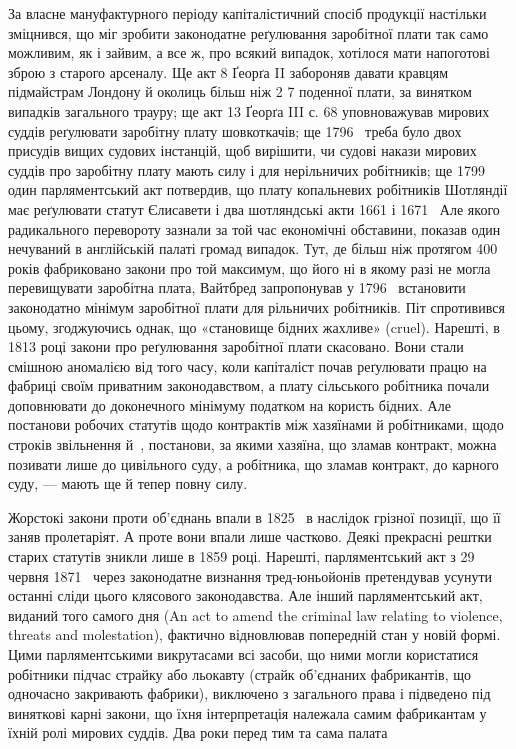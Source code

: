 За власне мануфактурного періоду капіталістичний спосіб
продукції настільки зміцнився, що міг зробити законодатне
реґулювання заробітної плати так само можливим, як і зайвим,
а все ж, про всякий випадок, хотілося мати напоготові зброю
з старого арсеналу. Ще акт 8 Ґеорґа II забороняв давати кравцям
підмайстрам Лондону й околиць більш ніж 2 7
поденної плати, за винятком випадків загального трауру; ще
\parbreak{}
\parcont{}
акт 13 Ґеорґа III с. 68 уповноважував мирових суддів реґулювати
заробітну плату шовкоткачів; ще 1796~ треба було двох
присудів вищих судових інстанцій, щоб вирішити, чи судові
накази мирових суддів про заробітну плату мають силу і для
нерільничих робітників; ще 1799~ один парляментський акт
потвердив, що плату копальневих робітників Шотляндії має
реґулювати статут Єлисавети і два шотляндські акти 1661 і 1671~
Але якого радикального перевороту зазнали за той час економічні
обставини, показав один нечуваний в англійській палаті
громад випадок. Тут, де більш ніж протягом 400 років фабриковано
закони про той максимум, що його ні в якому разі не
могла перевищувати заробітна плата, Вайтбред запропонував
у 1796~ встановити законодатно мінімум заробітної плати для
рільничих робітників. Піт спротивився цьому, згоджуючись
однак, що «становище бідних жахливе» (cruel). Нарешті, в
1813 році закони про реґулювання заробітної плати скасовано.
Вони стали смішною аномалією від того часу, коли капіталіст
почав реґулювати працю на фабриці своїм приватним законодавством,
а плату сільського робітника почали доповнювати до доконечного
мінімуму податком на користь бідних. Але постанови
робочих статутів щодо контрактів між хазяїнами й робітниками,
щодо строків звільнення й~, постанови, за якими хазяїна,
що зламав контракт, можна позивати лише до цивільного суду,
а робітника, що зламав контракт, до карного суду, — мають ще
й тепер повну силу.

Жорстокі закони проти об’єднань впали в 1825~ в наслідок
грізної позиції, що її заняв пролетаріят. А проте вони впали
лише частково. Деякі прекрасні рештки старих статутів зникли
лише в 1859 році. Нарешті, парляментський акт з 29 червня
1871~ через законодатне визнання тред-юньойонів претендував
усунути останні сліди цього клясового законодавства. Але
інший парляментський акт, виданий того самого дня (An act
to amend the criminal law relating to violence, threats and molestation),
фактично відновлював попередній стан у новій формі.
Цими парляментськими викрутасами всі засоби, що ними могли
користатися робітники підчас страйку або льокавту (страйк
об’єднаних фабрикантів, що одночасно закривають фабрики),
виключено з загального права і підведено під виняткові карні
закони, що їхня інтерпретація належала самим фабрикантам
у їхній ролі мирових суддів. Два роки перед тим та сама палата
\parbreak{}  %
